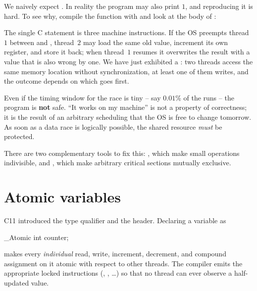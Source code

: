 We naively expect . In reality the program may also print $1$, and reproducing it is hard. To see why, compile the function with  and look at the body of :


The single C statement  is three machine instructions. If the OS preempts thread~$1$ between  and , thread~$2$ may load the same old value, increment its own register, and store it back; when thread~$1$ resumes it overwrites the result with a value that is also wrong by one. We have just exhibited a : two threads access the same memory location without synchronization, at least one of them writes, and the outcome depends on which goes first.

\begin{warningblock}
Even if the timing window for the race is tiny -- say $0.01\%$ of the runs -- the program is \textbf{not} safe. ``It works on my machine'' is not a property of correctness; it is the result of an arbitrary scheduling that the OS is free to change tomorrow. As soon as a data race is logically possible, the shared resource \emph{must} be protected.
\end{warningblock}

There are two complementary tools to fix this: , which make small operations indivisible, and , which make arbitrary critical sections mutually exclusive.

\section{Atomic variables}

C11 introduced the  type qualifier and the  header. Declaring a variable as

\begin{codeblock}[language=C, numbers=none]
_Atomic int counter;
\end{codeblock}

makes every \emph{individual} read, write, increment, decrement, and compound assignment on it atomic with respect to other threads. The compiler emits the appropriate locked instructions (, , \dots) so that no thread can ever observe a half-updated value.

